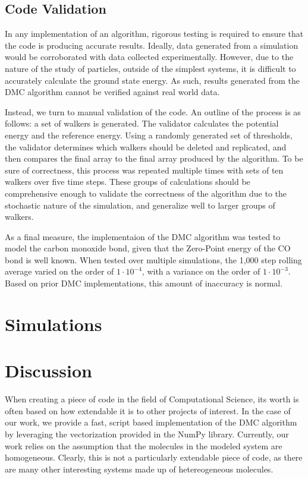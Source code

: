 \documentclass[journal=jacsat,manuscript=article]{achemso}
\begin{document}
\subsection{Code Validation}

In any implementation of an algorithm, rigorous testing is required to ensure that the code is producing accurate results. Ideally, data generated from a simulation would be corroborated with data collected experimentally. However, due to the nature of the study of particles, outside of the simplest systems, it is difficult to accurately calculate the ground state energy. As such, results generated from the DMC algorithm cannot be verified against real world data. 

Instead, we turn to manual validation of the code. An outline of the process is as follows: a set of walkers is generated. The validator calculates the potential energy and the reference energy. Using a randomly generated set of thresholds, the validator determines which walkers should be deleted and replicated, and then compares the final array to the final array produced by the algorithm. To be sure of correctness, this process was repeated multiple times with sets of ten walkers over five time steps. These groups of calculations should be comprehensive enough to validate the correctness of the algorithm due to the stochastic nature of the simulation, and generalize well to larger groups of walkers. 

As a final measure, the implementaion of the DMC algorithm was tested to model the carbon monoxide bond, given that the Zero-Point energy of the CO bond is well known. When tested over multiple simulations, the 1,000 step rolling average varied on the order of  $1\cdot10^{-4}$, with a variance on the order of $1\cdot10^{-3}$. Based on prior DMC implementations, this amount of inaccuracy is normal.  

\section{Simulations}

\section{Discussion}
When creating a piece of code in the field of Computational Science, its worth is often based on how extendable it is to other projects of interest. In the case of our work, we provide a fast, script based implementation of the DMC algorithm by leveraging the vectorization provided in the NumPy library. Currently, our work relies on the assumption that the molecules in the modeled system are homogeneous. Clearly, this is not a particularly extendable piece of code, as there are many other interesting systems made up of hetereogeneous molecules. 
\end{document}
